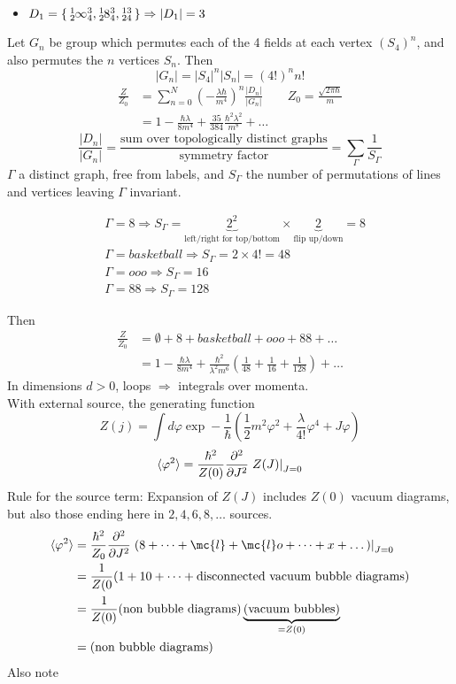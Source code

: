 \documentclass{article}
\begin{document}
\begin{itemize}
    \item $D_1 = \set{\tensor*[^1_2]{\infty}{^3_4},\tensor*[^1_2]{8}{^3_4}, \tensor*[^1_2]{}{^3_4} } \Rightarrow |D_1| = 3$
\end{itemize}
Let $G_n$ be group which permutes each of the 4 fields at each vertex $(S_4)^n$, and also permutes the $n$ vertices $S_n$. Then 
\[
|G_n| = |S_4|^n |S_n| = (4!)^n n!
\]
\begin{align*}
\frac{Z}{Z_0} &= \sum_{n=0}^N \left(-\frac{\lambda\hbar}{m^4} \right)^n \frac{|D_n|}{|G_n|} \qquad Z_0 =\frac{\sqrt{2\pi\hbar}}{m} \\
&= 1 - \frac{\hbar\lambda}{8m^4} + \frac{35}{384}\frac{\hbar^2 \lambda^2}{m^8}+\dots
\end{align*}
\[
\frac{|D_n|}{|G_n|} = \frac{\text{sum over topologically distinct graphs}}{\text{symmetry factor}} = \sum_{\Gamma} \frac{1}{S_\Gamma}
\]
$\Gamma$ a distinct graph, free from labels, and $S_\Gamma$ the number of permutations of lines and vertices leaving $\Gamma$ invariant. 

\begin{example}
\begin{align*}
&\Gamma = 8 \Rightarrow S_\Gamma = \underbrace{2^2}_{\text{left/right for top/bottom}} \times \underbrace{2}_{\text{flip up/down}}=8 \\
&\Gamma = basketball \Rightarrow S_\Gamma = 2 \times 4! = 48 \\
&\Gamma = ooo \Rightarrow S_\Gamma = 16 \\
&\Gamma = 8 8 \Rightarrow S_\Gamma = 128
\end{align*}
\end{example}
Then 
\begin{align*}
    \frac{Z}{Z_0} &= \emptyset + 8 + basketball + ooo + 8 8 + \dots \\
    &= 1 - \frac{\hbar\lambda}{8m^4} + \frac{\hbar^2}{\lambda^2 m^6} \left( \frac{1}{48} + \frac{1}{16} + \frac{1}{128} \right) + \dots 
\end{align*}
In dimensions $d>0$, loops $\Rightarrow$ integrals over momenta. \\
With external source, the generating function 
\[
Z(j) = \int d\varphi \exp -\frac{1}{\hbar} \left( \frac{1}{2}m^2 \varphi^2 + \frac{\lambda}{4!}\varphi^4 + J\varphi \right) 
\]
\[
\braket{\varphi^2} = \frac{\hbar^2}{Z(0)} \frac{\partial^2 }{\partial J^2} \left. Z(J) \right \rvert_{J=0}
\]
Rule for the source term: Expansion of $Z(J)$ includes $Z(0)$ vacuum diagrams, but also those ending here in $2,4,6,8,\dots$ sources. 
\begin{align*}
\braket{\varphi^2} &= \frac{\hbar^2}{Z_0} \pds{J} \left.\left( 8 + \dots + \mc{l} + \mc{l}o +\dots +x+\dots \right)\right\rvert_{J=0} \\
&= \frac{1}{Z(0} (1 + 10 + \dots + \text{disconnected vacuum bubble diagrams}) \\
&= \frac{1}{Z(0)} (\text{non bubble diagrams})\underbrace{(\text{vacuum bubbles})}_{=Z(0)} \\
&= (\text{non bubble diagrams})
\end{align*}
Also note 
\end{document}
